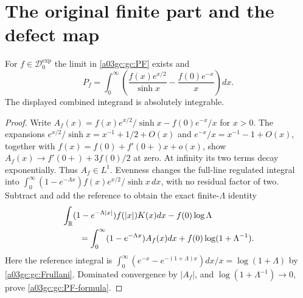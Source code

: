 \section{The original finite part and the defect map}

\begin{theorem}
For $f\in\mathcal D_0^{\exp}$ the limit in \eqref{a03gc:gc:PF} exists and
\begin{equation}
 \boxed{\displaystyle
 P_f=\int_0^\infty\left(
       \frac{f(x)e^{x/2}}{\sinh x}-\frac{f(0)e^{-x}}{x}\right)dx.}
 \label{a03gc:gc:PF-formula}
\end{equation}
The displayed combined integrand is absolutely integrable.
\end{theorem}
\begin{proof}
Write $A_f(x)=f(x)e^{x/2}/\sinh x-f(0)e^{-x}/x$ for $x>0$.
The expansions
$e^{x/2}/\sinh x=x^{-1}+1/2+O(x)$ and
$e^{-x}/x=x^{-1}-1+O(x)$, together with
$f(x)=f(0)+f'(0+)x+o(x)$, show
$A_f(x)\to f'(0+)+3f(0)/2$ at zero.
At infinity its two terms decay exponentially.  Thus $A_f\in L^1$.
Evenness changes the full-line regulated integral into
$\int_0^\infty(1-e^{-\Lambda x})f(x)e^{x/2}/\sinh x\,dx$,
with no residual factor of two.  Subtract and add the reference to obtain
the exact finite-$\Lambda$ identity
\begin{align}
 &\int_\mathbb R(1-e^{-\Lambda|x|})f(|x|)K(x)dx-f(0)\log\Lambda\notag\\
 &\qquad=\int_0^\infty(1-e^{-\Lambda x})A_f(x)dx
              +f(0)\log(1+\Lambda^{-1}).
 \label{a03gc:gc:finite-regulator}
\end{align}
Here the reference integral is
$\int_0^\infty(e^{-x}-e^{-(1+\Lambda)x})dx/x=\log(1+\Lambda)$
by \eqref{a03gc:gc:Frullani}.  Dominated convergence by $|A_f|$, and
$\log(1+\Lambda^{-1})\to0$, prove \eqref{a03gc:gc:PF-formula}.
\end{proof}

